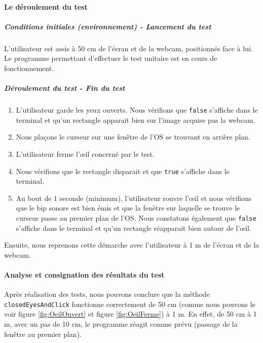 \paragraph{Le déroulement du test}

\subparagraph{Conditions initiales (environnement) - Lancement du test}

L’utilisateur est assis à 50 cm de l’écran et de la webcam, positionnés face à lui. Le programme permettant d’effectuer le test unitaire est en cours de fonctionnement.

\subparagraph{Déroulement du test - Fin du test}

\begin{enumerate}
\item L’utilisateur garde les yeux ouverts. Nous vérifions que \lstinline=false= s’affiche dans le terminal et qu’un rectangle apparait bien sur l’image acquise pas la webcam.
\item Nous plaçons le curseur sur une fenêtre de l’OS se trouvant en arrière plan.
\item L’utilisateur ferme l’œil concerné par le test.
\item Nous vérifions que le rectangle disparait et que \lstinline=true= s’affiche dans le terminal.
\item Au bout de 1 seconde (minimum), l’utilisateur rouvre l’œil et nous vérifions que le bip sonore est bien émis et que la fenêtre sur laquelle se trouve le curseur passe au premier plan de l’OS. Nous constatons également que \lstinline=false= s’affiche dans le terminal et qu’un rectangle réapparait bien autour de l’œil.
\end{enumerate}

Ensuite, nous reprenons cette démarche avec l’utilisateur à 1 m de l’écran et de la webcam.

\paragraph{Analyse et consignation des résultats du test}

Après réalisation des tests, nous pouvons conclure que la méthode \lstinline=closedEyesAndClick= fonctionne correctement de 50 cm (comme nous pouvons le voir figure \ref{fig:OeilOuvert} et figure \ref{fig:OeilFerme}) à 1 m. En effet, de 50 cm à 1 m, avec un pas de 10 cm, le programme réagit comme prévu (passage de la fenêtre au premier plan).